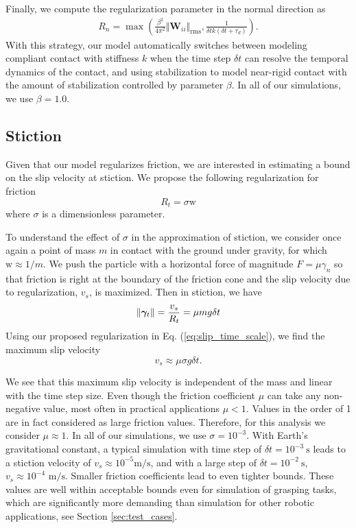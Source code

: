 Finally, we compute the regularization parameter in the normal direction as
\begin{eqnarray}
    R_n = \max\left(\frac{\beta^2}{4\pi^2}\Vert\mathbf{W}_{ii}\Vert_\text{rms}, 
    \frac{1}{\delta t k(\delta t+\tau_d)}\right)
    \label{eq:normal_regularization}.
\end{eqnarray}
With this strategy, our model automatically switches between modeling compliant
contact with stiffness $k$ when the time step $\delta t$ can resolve the
temporal dynamics of the contact, and using stabilization to model near-rigid
contact with the amount of stabilization controlled by parameter
$\beta$. In all of our simulations, we use $\beta=1.0$.

\subsection{Stiction}
\label{sec:stiction_parameterization}

Given that our model regularizes friction, we are interested in estimating a bound on
the slip velocity at stiction. We propose the following regularization for friction
\begin{equation}
    R_t = \sigma \text{w}
    \label{eq:slip_time_scale}
\end{equation}
where $\sigma$ is a dimensionless parameter.

To understand the effect of $\sigma$ in the approximation of stiction, we
consider once again a point of mass $m$ in contact with the ground under gravity,
for which $\text{w}\approx 1/m$. We push the particle with a horizontal force of magnitude
$F=\mu\gamma_n$ so that friction is right at the boundary of the friction cone and
the slip velocity due to regularization, $v_s$, is maximized. Then in stiction, we have
\begin{equation}
    \|{\bm\gamma}_t\| = \frac{v_s}{R_t} = \mu m g \delta t
\end{equation}
Using our proposed regularization in Eq. (\ref{eq:slip_time_scale}), we find
the maximum slip velocity
\begin{equation}
    v_s \approx \mu\sigma g \delta t.
    \label{eq:slip_estimation}
\end{equation}

We see that this maximum slip velocity is independent of the mass and linear
with the time step size. Even though the friction coefficient $\mu$ can take any
non-negative value, most often in practical applications $\mu < 1$. Values in the
order of 1 are in fact considered as large friction values. Therefore, for this
analysis we consider $\mu\approx 1$.
In all of our simulations, we use $\sigma=10^{-3}$. With
Earth's gravitational constant, a typical simulation with time step of $\delta
t=10^{-3}~\text{s}$ leads to a stiction velocity of $v_s\approx
10^{-5}\text{m}/\text{s}$, and with a large step of $\delta t=10^{-2}~\text{s}$,
$v_s\approx 10^{-4}\text{ m}/\text{s}$. Smaller friction coefficients lead to
even tighter bounds. These values are well within acceptable bounds even for
simulation of grasping tasks, which are significantly more demanding than
simulation for other robotic applications, see Section \ref{sec:test_cases}.

